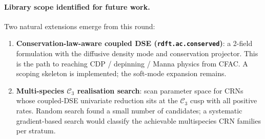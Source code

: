 \documentclass[11pt,a4paper]{article}
\theoremstyle{plain}
\newcommand{\Ck}{\mathcal{C}}
\begin{document}
\paragraph{Library scope identified for future work.}
Two natural extensions emerge from this round:
\begin{enumerate}[leftmargin=1.2em]
\item \textbf{Conservation-law-aware coupled DSE
  (\texttt{rdft.ac.conserved})}: a 2-field formulation with the
  diffusive density mode and conservation projector.  This is the
  path to reaching CDP / depinning / Manna physics from CFAC.  A
  scoping skeleton is implemented; the soft-mode expansion remains.
\item \textbf{Multi-species $\Ck_{3}$ realisation search}: scan
  parameter space for CRNs whose coupled-DSE univariate reduction
  sits at the $\Ck_{3}$ cusp with all positive rates.  Random search
  found a small number of candidates; a systematic gradient-based
  search would classify the achievable multispecies CRN families
  per stratum.
\end{enumerate}
\end{document}
